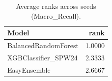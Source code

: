 \begin{table}[t]
\centering
\begin{tabular}{lr}
\toprule
Model & rank \\
\midrule
BalancedRandomForest & 1.0000 \\
XGBClassifier_SPW24 & 2.3333 \\
EasyEnsemble & 2.6667 \\
\bottomrule
\end{tabular}
\caption{Average ranks across seeds (Macro_Recall).}
\label{tab:avg_rank_Macro_Recall}
\end{table}